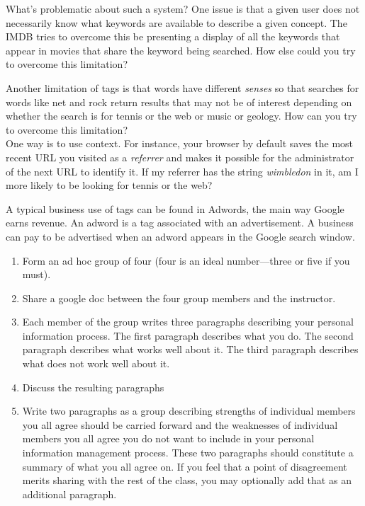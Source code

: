 What's problematic about such a system? One issue is that a given user
does not necessarily know what keywords are available to describe a
given concept. The IMDB tries to overcome this be presenting a display
of all the keywords that appear in movies that share the keyword being
searched. How else could you try to overcome this limitation?

Another limitation of tags is that words have different \emph{senses} so
that searches for words like net and rock return results that may not be
of interest depending on whether the search is for tennis or the web or
music or geology. How can you try to overcome this limitation?\\
One way is to use context. For instance, your browser by default saves
the most recent URL you visited as a \emph{referrer} and makes it
possible for the administrator of the next URL to identify it. If my
referrer has the string \emph{wimbledon} in it, am I more likely to be
looking for tennis or the web?

A typical business use of tags can be found in Adwords, the main way
Google earns revenue. An adword is a tag associated with an
advertisement. A business can pay to be advertised when an adword
appears in the Google search window.

\hypertarget{exercise-share-best-practices}{%
\label{exercise-share-best-practices}}

\begin{enumerate}
\def\labelenumi{\arabic{enumi}.}
\item
  Form an ad hoc group of four (four is an ideal number---three or five
  if you must).
\item
  Share a google doc between the four group members and the instructor.
\item
  Each member of the group writes three paragraphs describing your
  personal information process. The first paragraph describes what you
  do. The second paragraph describes what works well about it. The third
  paragraph describes what does not work well about it.
\item
  Discuss the resulting paragraphs
\item
  Write two paragraphs as a group describing strengths of individual
  members you all agree should be carried forward and the weaknesses of
  individual members you all agree you do not want to include in your
  personal information management process. These two paragraphs should
  constitute a summary of what you all agree on. If you feel that a
  point of disagreement merits sharing with the rest of the class, you
  may optionally add that as an additional paragraph.
\end{enumerate}

